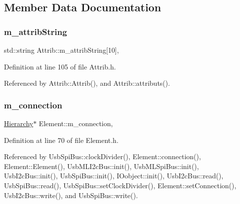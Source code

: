 \subsection{Member Data Documentation}
\mbox{\label{classAttrib_a3414521d7a82476e874b25a5407b5e63}} 
\subsubsection{\texorpdfstring{m\+\_\+attrib\+String}{m\_attribString}}
{\footnotesize\ttfamily std\+::string Attrib\+::m\+\_\+attrib\+String\mbox{[}10\mbox{]}\hspace{0.3cm}{\ttfamily [protected]}, {\ttfamily [inherited]}}



Definition at line 105 of file Attrib.\+h.



Referenced by Attrib\+::\+Attrib(), and Attrib\+::attributs().

\mbox{\label{classElement_abe3de7a5dbbc9a6dd2d7e012e5fdb266}} 
\subsubsection{\texorpdfstring{m\+\_\+connection}{m\_connection}}
{\footnotesize\ttfamily \hyperlink{classHierarchy}{Hierarchy}$\ast$ Element\+::m\+\_\+connection\hspace{0.3cm}{\ttfamily [protected]}, {\ttfamily [inherited]}}



Definition at line 70 of file Element.\+h.



Referenced by Usb\+Spi\+Bus\+::clock\+Divider(), Element\+::connection(), Element\+::\+Element(), Usb\+M\+L\+I2c\+Bus\+::init(), Usb\+M\+L\+Spi\+Bus\+::init(), Usb\+I2c\+Bus\+::init(), Usb\+Spi\+Bus\+::init(), I\+Oobject\+::init(), Usb\+I2c\+Bus\+::read(), Usb\+Spi\+Bus\+::read(), Usb\+Spi\+Bus\+::set\+Clock\+Divider(), Element\+::set\+Connection(), Usb\+I2c\+Bus\+::write(), and Usb\+Spi\+Bus\+::write().

